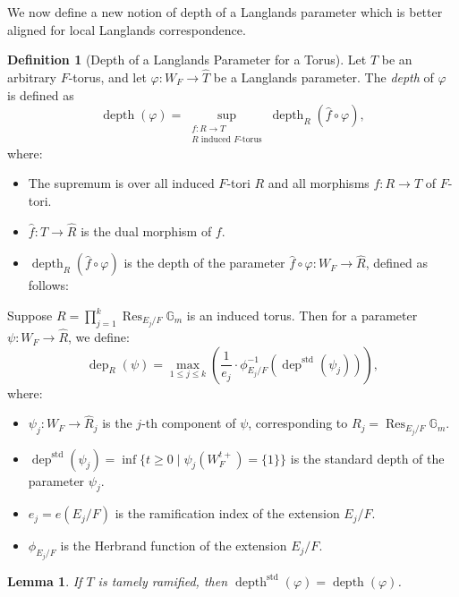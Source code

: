 \documentclass[american]{article}
\newcommand{\depthstd}{\operatorname{depth}^{\mathrm{std}}}
\numberwithin{equation}{section}
\numberwithin{figure}{section}
\theoremstyle{plain}
\newtheorem{lemma}[theorem]{Lemma}
\theoremstyle{definition}
\newtheorem{definition}[theorem]{Definition}
\theoremstyle{remark}
\DeclareMathOperator{\depth}{depth}
\DeclareMathOperator{\std}{std}
\begin{document}
We now define a new notion of depth of a Langlands parameter which is better aligned for local Langlands correspondence. 
\begin{definition}[Depth of a Langlands Parameter for a Torus]\label{def:depth-parameter}
Let \( T \) be an arbitrary \( F \)-torus, and let \( \varphi: W_F \to \widehat{T} \) be a Langlands parameter. The \emph{depth} of \( \varphi \) is defined as
\[
\operatorname{depth}(\varphi) = \sup_{\substack{f: R \to T \\ R\text{ induced }F\text{-torus}}} \operatorname{depth}_R(\widehat{f} \circ \varphi),
\]
where:
\begin{itemize}
  \item The supremum is over all induced \( F \)-tori \( R \) and all morphisms \( f: R \to T \) of \( F \)-tori.
  \item \( \widehat{f}: \widehat{T} \to \widehat{R} \) is the dual morphism of \( f \).
  \item \( \operatorname{depth}_R(\widehat{f} \circ \varphi) \) is the depth of the parameter \( \widehat{f} \circ \varphi: W_F \to \widehat{R} \), defined as follows:
\end{itemize}

Suppose \( R = \prod_{j=1}^{k} \operatorname{Res}_{E_j/F} \mathbb{G}_m \) is an induced torus. Then for a parameter \( \psi: W_F \to \widehat{R} \), we define:
\[
\operatorname{dep}_R(\psi) = \max_{1 \leq j \leq k} \left( \frac{1}{e_j} \cdot \phi_{E_j/F}^{-1}\left( \operatorname{dep}^{\std}(\psi_j) \right) \right),
\]
where:
\begin{itemize}
  \item \( \psi_j: W_F \to \widehat{R}_j \) is the \( j \)-th component of \( \psi \), corresponding to \( R_j = \operatorname{Res}_{E_j/F} \mathbb{G}_m \).
  \item \( \operatorname{dep}^{\std}(\psi_j) = \inf \{ t \geq 0 \mid \psi_j(W_F^{t+}) = \{1\} \} \) is the standard depth of the parameter \( \psi_j \).
  \item \( e_j = e(E_j/F) \) is the ramification index of the extension \( E_j/F \).
  \item \( \phi_{E_j/F} \) is the Herbrand function of the extension \( E_j/F \).
\end{itemize}
\end{definition}
\begin{lemma}
    If \(T\) is tamely ramified, then \(\depthstd(\varphi)=\depth(\varphi)\).
\end{lemma}
\end{document}
